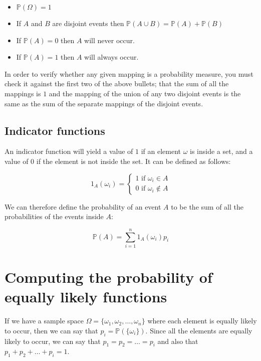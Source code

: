 \documentclass{article}
\begin{document}
\begin{itemize}
	\item $\mathbb{P}(\Omega) = 1$
	\item If $A$ and $B$ are disjoint events then $\mathbb{P}(A \cup B) = \mathbb{P}(A) + \mathbb{P}(B)$
	\item If $\mathbb{P}(A) = 0$ then $A$ will never occur.
	\item If $\mathbb{P}(A) = 1$ then $A$ will always occur.
\end{itemize}


In order to verify whether any given mapping is a probability measure, you must
check it against the first two of the above bullets; that the sum of all the
mappings is $1$ and the mapping of the union of any two disjoint events is the
same as the sum of the separate mappings of the disjoint events.

\subsection{Indicator functions}

An indicator function will yield a value of $1$ if an element $\omega$ is inside
a set, and a value of $0$ if the element is not inside the set. It can be
defined as follows:

\[
	1_A(\omega_i) = \begin{cases} 
						1\textrm{ if }\omega_i \in A\\
						0\textrm{ if }\omega_i \not\in A
					\end{cases}
\]

We can therefore define the probability of an event $A$ to be the sum of all the
probabilities of the events inside $A$:

\[
	\mathbb{P}(A) = \sum\limits_{i=1}^n1_A(\omega_i)p_i
\]


\section{Computing the probability of equally likely functions}

If we have a sample space $\Omega = \{ \omega_1, \omega_2, \dots, \omega_n \}$
where each element is equally likely to occur, then we can say that $p_i =
\mathbb{P}(\{\omega_i\})$. Since all the elements are equally likely to occur,
we can say that $p_1 = p_2 = \dots = p_i$ and also that $p_1 + p_2 + \dots + p_i
= 1$.
\end{document}
